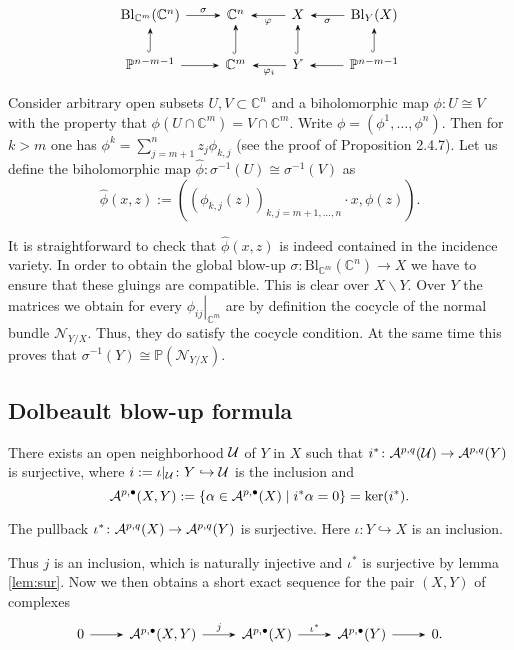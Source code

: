 \[
    \begin{tikzcd}
        \operatorname{Bl}_{\mathbb{C}^m}(\mathbb{C}^n)\rar[-Stealth,"\sigma"] & \mathbb{C}^n  & X\lar[-Stealth,"\varphi"]& \lar[-Stealth,"\sigma"] \operatorname{Bl}_{Y}(X)\\ 
        \mathbb{P}^{n-m-1}\uar[-Stealth,hook] \rar[-Stealth] &\mathbb{C}^m \uar[-Stealth,hook]&Y\lar[-Stealth,"\varphi_i"] \uar[-Stealth,hook]&\mathbb{P}^{n-m-1}\uar[-Stealth,hook]\lar[-Stealth]
    \end{tikzcd}
\]

Consider arbitrary open subsets $U, V \subset \mathbb{C}^n$ and a biholomorphic map $\phi: U \cong V$ with the property that $\phi\left(U \cap \mathbb{C}^m\right)=V \cap \mathbb{C}^m$. Write $\phi=\left(\phi^1, \ldots, \phi^n\right)$. Then for $k>m$ one has $\phi^k=\sum_{j=m+1}^n z_j \phi_{k, j}$ (see the proof of Proposition 2.4.7). Let us define the biholomorphic map $\hat{\phi}: \sigma^{-1}(U) \cong \sigma^{-1}(V)$ as
$$
\hat{\phi}(x, z):=\left(\left(\phi_{k, j}(z)\right)_{k, j=m+1, \ldots, n} \cdot x, \phi(z)\right) .
$$

It is straightforward to check that $\hat{\phi}(x, z)$ is indeed contained in the incidence variety. In order to obtain the global blow-up $\sigma: \mathrm{Bl}_{\mathbb{C}^m}\left(\mathbb{C}^n\right) \rightarrow X$ we have to ensure that these gluings are compatible. This is clear over $X \backslash Y$. Over $Y$ the matrices we obtain for every $\left.\phi_{i j}\right|_{\mathbb{C}^m}$ are by definition the cocycle of the normal bundle $\mathcal{N}_{Y / X}$. Thus, they do satisfy the cocycle condition. At the same time this proves that $\sigma^{-1}(Y) \cong \mathbb{P}\left(\mathcal{N}_{Y / X}\right)$.


\subsection{Dolbeault blow-up formula}

\begin{lem}
    There exists an open neighborhood ${\mathcal U}$ of $Y$ in $X$ such that $i^*\colon {\mathcal A}^{p,q}({\mathcal U})\to{\mathcal A}^{p,q}(Y)$ is surjective, where $i:=\iota|_{{\mathcal U}}\colon Y\hookrightarrow{\mathcal U} $  is the inclusion and 
    \[
        {\mathcal A}^{p,\bullet}(X,Y):=\{\alpha\in{\mathcal A}^{p,\bullet}(X)\mid i^*\alpha=0\}=\ker (i^*).
    \]
\end{lem}

\begin{lem}\label{lem:sur}

    The pullback $\iota^*\colon {\mathcal A}^{p,q}(X)\to{\mathcal A}^{p,q}(Y)$ is surjective. Here $\iota\colon Y\hookrightarrow X$  is an inclusion.
\end{lem}
Thus $j$ is an inclusion, which is naturally injective and $\iota^*$ is surjective by lemma   \ref{lem:sur}. Now we then obtains a short exact sequence for the pair $(X,Y)$ of complexes
 \[
    \begin{tikzcd}
        0\rar[-Stealth]  & \mA^{p,\bullet}(X,Y) \rar[-Stealth,"j"] & \mA^{p,\bullet}(X)\rar[-Stealth,"\iota^*"] &  \mA^{p,\bullet}(Y) \rar[-Stealth]  &0.
    \end{tikzcd}
 \]

